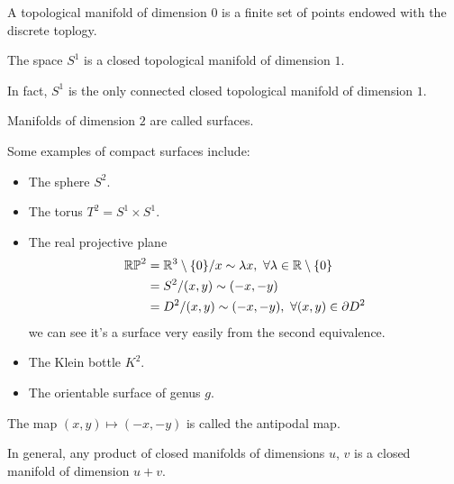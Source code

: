 \documentclass[11pt,a4paper]{article}
\begin{document}
\begin{example}
  A topological manifold of dimension $0$ is a finite set of points endowed
  with the discrete toplogy.
\end{example}

\begin{example}
  The space $S^1$ is a closed topological manifold of dimension $1$.
\end{example}
\begin{remark}
  In fact, $S^1$ is the only connected closed topological manifold
  of dimension $1$.
\end{remark}

\begin{remark}
  Manifolds of dimension $2$ are called surfaces.
\end{remark}

Some examples of compact surfaces include:
\begin{itemize}
  \item The sphere $S^2$.
  \item The torus $T^2 = S^1 \times S^1$.
  \item The real projective plane
    \begin{align*}
      \RP^2 &= {\R^3 \setminus \set{0}}/{x \sim \lambda x},\ 
        \forall \lambda \in \R \setminus \set{0} \\
      &= {S^2}/{(x,y) \sim (-x,-y)} \\
      &= {D^2}/{(x,y) \sim (-x,-y)},\ \forall (x,y) \in \partial D^2
    \end{align*}
  we can see it's a surface very easily from the second equivalence.
  \item The Klein bottle $K^2$.
  \item The orientable surface of genus $g$.
\end{itemize}
\begin{remark}
  The map $(x,y) \mapsto (-x,-y)$ is called the antipodal map.
\end{remark}
\begin{remark}
    In general, any product of closed manifolds of dimensions
    $u$, $v$ is a closed manifold of dimension $u + v$.
\end{remark}

\end{document}
